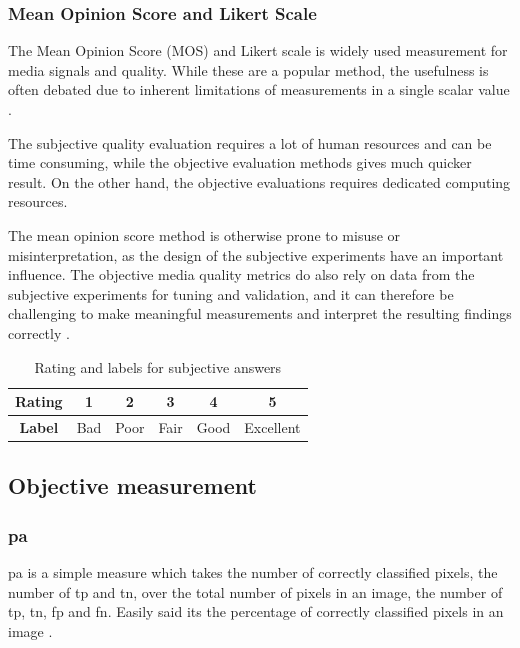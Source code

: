 \subsubsection{Mean Opinion Score and Likert Scale}
\label{sec:mos}
The Mean Opinion Score (MOS) \cite{Streijl2016} and Likert scale \cite{likert_scale} is widely used measurement for media signals and quality. While these are a popular method, the usefulness is often debated due to inherent limitations of measurements in a single scalar value \cite{wiki_mos}. 

The subjective quality evaluation requires a lot of human resources and can be time consuming, while the objective evaluation methods gives much quicker result. On the other hand, the objective evaluations requires dedicated computing resources.

The mean opinion score method is otherwise prone to misuse or misinterpretation, as the design of the subjective experiments have an important influence. The objective media quality metrics do also rely on data from the subjective experiments for tuning and validation, and it can therefore be challenging to make meaningful measurements and interpret the resulting findings correctly \cite{Streijl2016}.


\begin{table}[]
    \centering
    \begin{tabular}{ |c|c|c|c|c|c| } 
         \hline
         \textbf{Rating} & 1 & 2 & 3 & 4 & 5 \\
         \hline
         \textbf{Label} & Bad & Poor & Fair & Good & Excellent \\ 
         \hline
    \end{tabular}
    \caption{Rating and labels for subjective answers}
    \label{tab:ratin_label}
\end{table}

\subsection{Objective measurement}\label{sec:objective_measurement}

\subsubsection{\acrlong{pa}}
\acrfull{pa} is a simple measure which takes the number of correctly classified pixels, the number of \acrlong{tp} and \acrlong{tn}, over the total number of pixels in an image, the number of \acrlong{tp}, \acrlong{tn}, \acrshort{fp} and \acrshort{fn}. Easily said its the percentage of correctly classified pixels in an image \cite{jeremy}.

